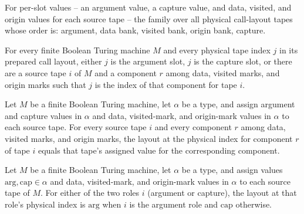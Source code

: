 \begin{definition}
\label{Turing.FinTM.emCallLayout}
\leanok
{}
For per-slot values -- an argument value, a capture value, and data, visited, and origin
values for each source tape -- the family over all physical call-layout tapes whose
order is: argument, data bank, visited bank, origin bank, capture.
\end{definition}

\begin{lemma}
\label{Turing.FinTM.emCall_layout_cases}
\leanok
{}
For every finite Boolean Turing machine $M$ and every physical tape index $j$ in its
prepared call layout, either $j$ is the argument slot, $j$ is the capture slot, or there
are a source tape $i$ of $M$ and a component $r$ among data, visited marks, and origin
marks such that $j$ is the index of that component for tape $i$.
\end{lemma}

\begin{lemma}
\label{Turing.FinTM.emCall_layout_triple}
\leanok
{}
Let $M$ be a finite Boolean Turing machine, let $\alpha$ be a type, and assign argument
and capture values in $\alpha$ and data, visited-mark, and origin-mark values in
$\alpha$ to each source tape. For every source tape $i$ and every component $r$ among
data, visited marks, and origin marks, the layout at the physical index for component
$r$ of tape $i$ equals that tape's assigned value for the corresponding component.
\end{lemma}

\begin{lemma}
\label{Turing.FinTM.emCall_layout_pair}
\leanok
{}
Let $M$ be a finite Boolean Turing machine, let $\alpha$ be a type, and assign values
$\mathrm{arg},\mathrm{cap}\in\alpha$ and data, visited-mark, and origin-mark values in
$\alpha$ to each source tape of $M$. For either of the two roles $i$ (argument or
capture), the layout at that role's physical index is $\mathrm{arg}$ when $i$ is the
argument role and $\mathrm{cap}$ otherwise.
\end{lemma}

